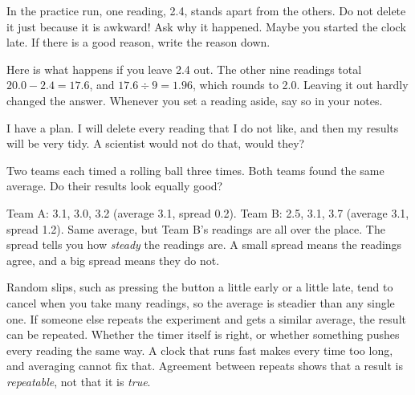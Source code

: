 \clearpage

In the practice run, one reading, 2.4, stands apart from the others. Do not delete it just because it is awkward! Ask why it happened. Maybe you started the clock late. If there is a good reason, write the reason down.

Here is what happens if you leave 2.4 out. The other nine readings total $20.0-2.4=17.6$, and $17.6\div9=1.96$, which rounds to 2.0. Leaving it out hardly changed the answer. Whenever you set a reading aside, say so in your notes.

\begin{multix}[hmm]\multixbot[hmm]\tcblower
I have a plan. I will delete every reading that I do not like, and then my results will be very tidy. A scientist would not do that, would they?
\end{multix}

Two teams each timed a rolling ball three times. Both teams found the same average. Do their results look equally good?

\begin{center}
\end{center}

Team A: 3.1, 3.0, 3.2 (average 3.1, spread 0.2). Team B: 2.5, 3.1, 3.7 (average 3.1, spread 1.2). Same average, but Team B's readings are all over the place. The spread tells you how \emph{steady} the readings are. A small spread means the readings agree, and a big spread means they do not.

{Random slips, such as pressing the button a little early or a little late, tend to cancel when you take many readings, so the average is steadier than any single one. If someone else repeats the experiment and gets a similar average, the result can be repeated.}
{Whether the timer itself is right, or whether something pushes every reading the same way. A clock that runs fast makes every time too long, and averaging cannot fix that. Agreement between repeats shows that a result is \emph{repeatable}, not that it is \emph{true}.}


